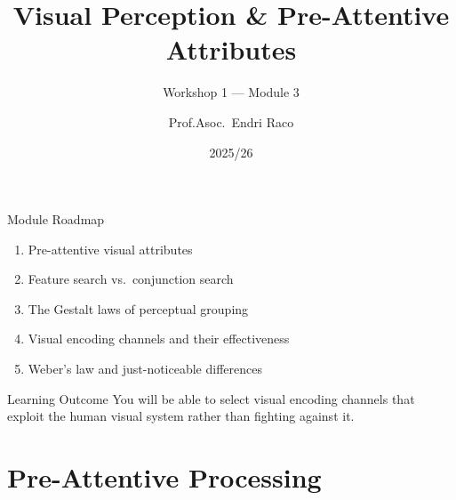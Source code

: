 \documentclass[10pt]{beamer}
\title{Visual Perception \& Pre-Attentive Attributes}
\subtitle{Workshop 1 --- Module 3}
\author{Prof.Asoc.\ Endri Raco}
\institute{Data Visualization for Data Scientists \\ UNYT Tirana}
\date{2025/26}
\begin{document}
\begin{frame}
  \titlepage
\end{frame}

\begin{frame}{Module Roadmap}
  \begin{enumerate}
    \item Pre-attentive visual attributes
    \item Feature search vs.\ conjunction search
    \item The Gestalt laws of perceptual grouping
    \item Visual encoding channels and their effectiveness
    \item Weber's law and just-noticeable differences
  \end{enumerate}
  \begin{exampleblock}{Learning Outcome}
    You will be able to select visual encoding channels that exploit the
    human visual system rather than fighting against it.
  \end{exampleblock}
\end{frame}

\section{Pre-Attentive Processing}
\end{document}
